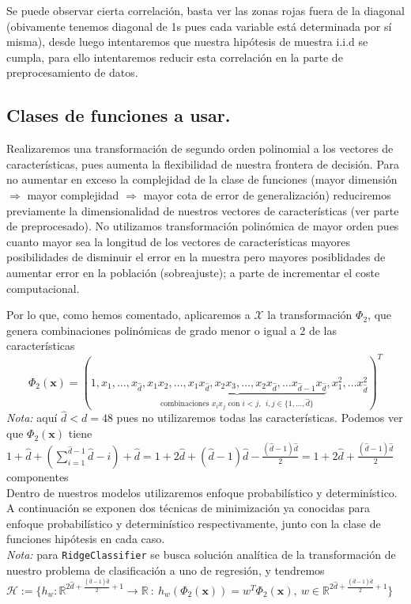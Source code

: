 \documentclass[11pt,a4paper]{article}
\theoremstyle{definition}
\newcommand{\R}{\mathbb{R}}
\begin{document}
	Se puede observar cierta correlación, basta ver las zonas rojas fuera de la diagonal (obivamente tenemos diagonal de 1s pues cada variable está determinada por sí misma), desde luego intentaremos que nuestra hipótesis de muestra i.i.d se cumpla, para ello intentaremos reducir esta correlación en la parte de preprocesamiento de datos.
	\fi
	\subsection{Clases de funciones a usar.}
	Realizaremos una transformación de segundo orden polinomial a los vectores de características, pues aumenta la flexibilidad de nuestra frontera de decisión. Para no aumentar en exceso la complejidad de la clase de funciones (mayor dimensión $\Rightarrow$ mayor complejidad $\Rightarrow$ mayor cota de error de generalización) reduciremos previamente la dimensionalidad de nuestros vectores de características (ver parte de preprocesado). No utilizamos transformación polinómica de mayor orden pues cuanto mayor sea la longitud de los vectores de características mayores posibilidades de disminuir el error en la muestra pero mayores posiblidades de aumentar error en la población (sobreajuste); a parte de incrementar el coste computacional.
	
	Por lo que, como hemos comentado, aplicaremos a  $\mathcal{X}$ la transformación $\Phi_2$, que genera combinaciones polinómicas de grado menor o igual a 2 de las características $$\Phi_2(\mathbf{x})=(1,x_1,\ldots, x_{\hat d},\underbrace{x_1x_2,\ldots ,x_1x_{\hat d},x_2x_3,\ldots ,x_2x_{\hat d},  \ldots
	 x_{\hat d-1}x_{\hat d}}_{\text{combinaciones } x_ix_j \text{ con } i<j,\ \  i,j\in \{1,\ldots , \hat d\}}, x_1^2,\ldots x_{\hat d}^2)^T$$
	\textit{Nota:} aquí $\hat d< d=48$ pues no utilizaremos todas las características. Podemos ver que $\Phi_2(\mathbf{x})$ tiene $1+\hat d  + (\sum_{i=1}^{\hat d-1} \hat d -i) + \hat d  = 1 + 2\hat d + (\hat d -1)\hat d - \frac{(\hat d -1)\hat d}{2}=1+2\hat d + \frac{(\hat d -1)\hat d}{2}$ componentes\\
	
	Dentro de nuestros modelos utilizaremos enfoque probabilístico y determinístico. A continuación se exponen dos técnicas de minimización ya conocidas para enfoque probabilístico y determinístico respectivamente, junto con la clase de funciones hipótesis en cada caso. \\
	\textit{Nota:} para \texttt{RidgeClassifier} se busca solución analítica de la transformación de nuestro problema de clasificación a uno de regresión, y tendremos $\mathcal{H}:=\{h_w\colon \R^{2\hat d + \frac{(\hat d -1)\hat d}{2}+1}\to \R \ : \ h_w(\Phi_2(\mathbf{x}))=w^T\Phi_2(\mathbf{x}), \ w\in \R^{2\hat d + \frac{(\hat d -1)\hat d}{2}+1}\}$\\
	
\end{document}
